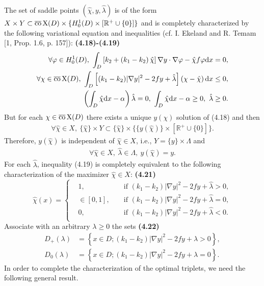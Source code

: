 \documentclass{book}
\numberwithin{equation}{section}
\begin{document}
\begin{enumerate}
    The set of saddle points $\left(\hat{\chi},y,\hat{\lambda}\right)$ is of the form $X\times Y\subset\overline{\rm co}\operatorname{X}(D)\times\{H_0^1(D)\times[\mathbb{R}^+\cup\{0\}]\}$ and is completely characterized by the following variational equation and inequalities (cf. I. Ekeland and R. Temam [1, Prop. 1.6, p. 157]): \textbf{(4.18)-(4.19)}
    \begin{align*}
        \forall\varphi\in H_0^1(D),\ \int_D \left[k_2 + \left(k_1 - k_2\right)\hat{\chi}\right]\nabla y\cdot\nabla\varphi - \hat{\chi}f\varphi{\rm d}x &= 0,\\
        \forall\chi\in\overline{\rm co}\operatorname{X}(D),\ \int_D \left[(k_1 - k_2)|\nabla y|^2 - 2fy + \hat{\lambda}\right]\left(\chi - \hat{\chi}\right){\rm d}x&\le 0,\\
        \left(\int_D \hat{\chi}{\rm d}x - \alpha\right)\hat{\lambda} = 0,\ \int_D \hat{\chi}{\rm d}x - \alpha\ge 0,\ \hat{\lambda}&\ge 0.
    \end{align*}
    But for each $\chi\in\overline{\rm co}\operatorname{X}(D)$ there exists a unique $y(\chi)$ solution of (4.18) and then
    \begin{align*}
        \forall\hat{\chi}\in X,\ \{\hat{\chi}\}\times Y\subset\{\hat{\chi}\}\times\{\{y(\hat{\chi})\}\times[\mathbb{R}^+\cup\{0\}]\}.
    \end{align*} 
    Therefore, $y(\hat{\chi})$ is independent of $\hat{\chi}\in X$, i.e., $Y = \{y\}\times\Lambda$ and
    \begin{align*}
        \forall\hat{\chi}\in X,\ \hat{\lambda}\in\Lambda,\ y(\hat{\chi}) = y.
    \end{align*}
    For each $\hat{\lambda}$, inequality (4.19) is completely equivalent to the following characterization of the maximizer $\hat{\chi}\in X$: \textbf{(4.21)}
    \begin{equation*}
        \hat{\chi}(x) = \left\{\begin{split}
            &1,&&\mbox{ if } (k_1 - k_2)|\nabla y|^2 - 2fy + \hat{\lambda} > 0,\\
            &\in[0,1],&&\mbox{ if } (k_1 - k_2)|\nabla y|^2 - 2fy + \hat{\lambda} = 0,\\
            &0,&&\mbox{ if } (k_1 - k_2)|\nabla y|^2 - 2fy + \hat{\lambda} < 0.\\
        \end{split}\right.
    \end{equation*}
    Associate with an arbitrary $\lambda\ge 0$ the sets \textbf{(4.22)}
    \begin{align*}
        D_+(\lambda) &= \left\{x\in D;(k_1 - k_2)|\nabla y|^2 - 2fy + \lambda > 0\right\},\\
        D_0(\lambda) &= \left\{x\in D;(k_1 - k_2)|\nabla y|^2 - 2fy + \lambda = 0\right\}.
    \end{align*}
    In order to complete the characterization of the optimal triplets, we need the following general result.
    

\end{enumerate}
\end{document}
